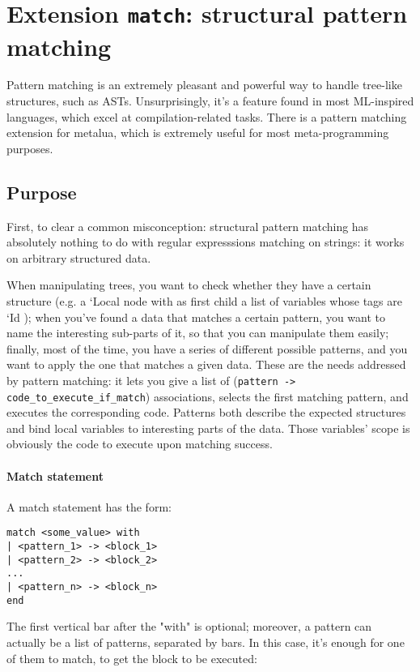 \section{Extension {\tt match}: structural pattern matching}
Pattern matching is an extremely pleasant and powerful way to handle tree-like
structures, such as ASTs. Unsurprisingly, it's a feature found in most
ML-inspired languages, which excel at compilation-related tasks. There is a
pattern matching extension for metalua, which is extremely useful for most
meta-programming purposes.

\subsection{Purpose}

First, to clear a common misconception: structural pattern matching has
absolutely nothing to do with regular expresssions matching on strings: it works
on arbitrary structured data.

When manipulating trees, you want to check whether they have a certain structure
(e.g. a `Local{ } node with as first child a list of variables whose tags are
`Id{ }); when you've found a data that matches a certain pattern, you want to
name the interesting sub-parts of it, so that you can manipulate them easily;
finally, most of the time, you have a series of different possible patterns, and
you want to apply the one that matches a given data. These are the needs
addressed by pattern matching: it lets you give a list of ({\tt pattern ->
  code\_to\_execute\_if\_match}) associations, selects the first matching
pattern, and executes the corresponding code. Patterns both describe the
expected structures and bind local variables to interesting parts of the data.
Those variables' scope is obviously the code to execute upon matching success.

\paragraph{Match statement} 
A match statement has the form:

\begin{verbatim}
match <some_value> with
| <pattern_1> -> <block_1>
| <pattern_2> -> <block_2>
...
| <pattern_n> -> <block_n>
end
\end{verbatim}

The first vertical bar after the "with" is optional; moreover, a pattern can
actually be a list of patterns, separated by bars. In this case, it's enough for
one of them to match, to get the block to be executed:

